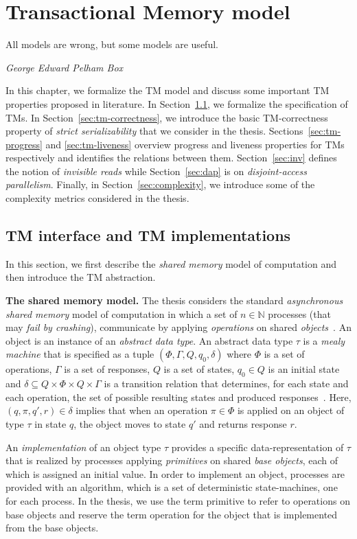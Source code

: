 \chapter{Transactional Memory model}
\label{ch:tm-model}
\epigraph{All models are wrong, but some models are useful.}
{\textit{George Edward Pelham Box}}
In this chapter, we formalize the TM model and discuss some important TM properties proposed in literature.
In Section~\ref{sec:c21}, we formalize the specification of TMs.
In Section~\ref{sec:tm-correctness}, we introduce the basic TM-correctness property of \emph{strict serializability}
that we consider in the thesis.
Sections~\ref{sec:tm-progress} and \ref{sec:tm-liveness} overview progress and liveness properties for TMs
respectively and identifies the relations between them.
Section~\ref{sec:inv} defines the notion of \emph{invisible reads} while
Section~\ref{sec:dap} is on \emph{disjoint-access parallelism}.
Finally, in Section~\ref{sec:complexity}, we introduce some of the complexity metrics considered in the thesis.
\section{TM interface and TM implementations}
\label{sec:c21}
In this section, we first describe the \emph{shared memory} model of computation and then introduce the TM abstraction.

\vspace{1mm}\noindent\textbf{The shared memory model.}
The thesis considers the standard \emph{asynchronous shared memory} model of computation in which
a set of $n\in \mathbb{N}$ processes (that may \emph{fail by crashing}), 
communicate by applying \emph{operations} on shared \emph{objects}~\cite{AGHK09}.
An object is an instance of an \emph{abstract data type}.
An abstract data type $\tau$ is a \emph{mealy machine} that is specified as a tuple
$(\Phi,\Gamma, Q, q_0, \delta)$ where
$\Phi$ is a set of operations,
$\Gamma$ is a set of responses, $Q$ is a set of states, $q_0\in Q$ is an
initial state and $\delta \subseteq Q\times \Phi \times Q\times \Gamma$ 
is a transition relation that determines, for each state
and each operation, the set of possible
resulting states and produced responses~\cite{AFHHT07}. 
Here, $(q,\pi,q',r) \in \delta$ implies that when
an operation $\pi \in \Phi$ is applied on an object of type $\tau$
in state $q$, the object moves to state $q'$ and returns response $r$.

An \emph{implementation} of an object type $\tau$ provides a specific data-representation of $\tau$ that is realized by
processes applying \emph{primitives} on shared \emph{base objects}, each of which is assigned an initial value. 
In order to implement an object, processes are provided with an algorithm, which is a set of deterministic
state-machines, one for each process.
In the thesis, we use the term primitive to refer to operations on base objects and reserve the term operation
for the object that is implemented from the base objects.


